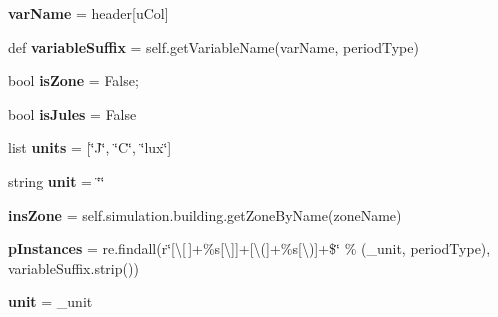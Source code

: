 \begin{DoxyCompactItemize}
\item 
\mbox{\label{class_f_plots_1_1_frm_plots_aa7920c54f52119ab7bbecc3c9e6c3731}} 
{\bfseries var\+Name} = header\mbox{[}u\+Col\mbox{]}
\item 
\mbox{\label{class_f_plots_1_1_frm_plots_a455b5434bd61d232ba23f793d13620b2}} 
def {\bfseries variable\+Suffix} = self.\+get\+Variable\+Name(var\+Name, period\+Type)
\item 
\mbox{\label{class_f_plots_1_1_frm_plots_ad1c0b3717e6182f047d62a259f81afd0}} 
bool {\bfseries is\+Zone} = False;
\item 
\mbox{\label{class_f_plots_1_1_frm_plots_aba9baf3d17b1c9bb51f98385827d9b83}} 
bool {\bfseries is\+Jules} = False
\item 
\mbox{\label{class_f_plots_1_1_frm_plots_ab9332009a6be0d70c6efec2281de2887}} 
list {\bfseries units} = \mbox{[}\char`\"{}J\char`\"{}, \char`\"{}C\char`\"{}, \char`\"{}lux\char`\"{}\mbox{]}
\item 
\mbox{\label{class_f_plots_1_1_frm_plots_a665cad909f1fdd53f768e81de9b62de0}} 
string {\bfseries unit} = \char`\"{}\char`\"{}
\item 
\mbox{\label{class_f_plots_1_1_frm_plots_a1287d0f82f914d356b2dddbdc59ead5f}} 
{\bfseries ins\+Zone} = self.\+simulation.\+building.\+get\+Zone\+By\+Name(zone\+Name)
\item 
\mbox{\label{class_f_plots_1_1_frm_plots_afa30c3710cc46df7090e8ad5bc561308}} 
{\bfseries p\+Instances} = re.\+findall(r\char`\"{}\mbox{[}\textbackslash{}\mbox{[}$\,$\mbox{]}+\%s\mbox{[}\textbackslash{}\mbox{]}\mbox{]}+\mbox{[}\textbackslash{}(\mbox{]}+\%s\mbox{[}\textbackslash{})\mbox{]}+\$\char`\"{} \% (\+\_\+unit, period\+Type), variable\+Suffix.\+strip())
\item 
\mbox{\label{class_f_plots_1_1_frm_plots_a382b9040d9c3849b9350104bb5b3acfc}} 
{\bfseries unit} = \+\_\+unit
\item 

\end{DoxyCompactItemize}
